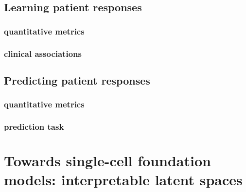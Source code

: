 \section{Learning patient responses}
\subsection{quantitative metrics}
\subsection{clinical associations}

\section{ Predicting patient responses}
\subsection{ quantitative metrics}
\subsection{ prediction task}

\chapter{Towards single-cell foundation models: interpretable latent spaces}
